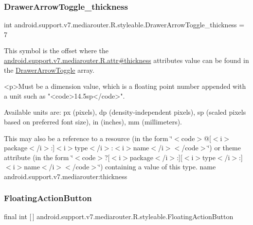 \subsubsection{\texorpdfstring{Drawer\+Arrow\+Toggle\+\_\+thickness}{DrawerArrowToggle\_thickness}}
{\footnotesize\ttfamily int android.\+support.\+v7.\+mediarouter.\+R.\+styleable.\+Drawer\+Arrow\+Toggle\+\_\+thickness = 7\hspace{0.3cm}{\ttfamily [static]}}

This symbol is the offset where the \hyperlink{classandroid_1_1support_1_1v7_1_1mediarouter_1_1R_1_1attr_a72390830cb40268bf0727b9d2964518b}{android.\+support.\+v7.\+mediarouter.\+R.\+attr\#thickness} attribute\textquotesingle{}s value can be found in the \hyperlink{classandroid_1_1support_1_1v7_1_1mediarouter_1_1R_1_1styleable_a71030bdd9f81aafe32f56767ba04e5b0}{Drawer\+Arrow\+Toggle} array.

\begin{DoxyVerb}      <p>Must be a dimension value, which is a floating point number appended with a unit such as "<code>14.5sp</code>".
\end{DoxyVerb}
 Available units are\+: px (pixels), dp (density-\/independent pixels), sp (scaled pixels based on preferred font size), in (inches), mm (millimeters). 

This may also be a reference to a resource (in the form \char`\"{}$<$code$>$@\mbox{[}$<$i$>$package$<$/i$>$\+:\mbox{]}$<$i$>$type$<$/i$>$\+:$<$i$>$name$<$/i$>$$<$/code$>$\char`\"{}) or theme attribute (in the form \char`\"{}$<$code$>$?\mbox{[}$<$i$>$package$<$/i$>$\+:\mbox{]}\mbox{[}$<$i$>$type$<$/i$>$\+:\mbox{]}$<$i$>$name$<$/i$>$$<$/code$>$\char`\"{}) containing a value of this type.  name android.\+support.\+v7.\+mediarouter\+:thickness \mbox{\label{classandroid_1_1support_1_1v7_1_1mediarouter_1_1R_1_1styleable_ae665bad1758a0b708ec034929b76af91}} 
\subsubsection{\texorpdfstring{Floating\+Action\+Button}{FloatingActionButton}}
{\footnotesize\ttfamily final int \mbox{[}$\,$\mbox{]} android.\+support.\+v7.\+mediarouter.\+R.\+styleable.\+Floating\+Action\+Button\hspace{0.3cm}{\ttfamily [static]}}

